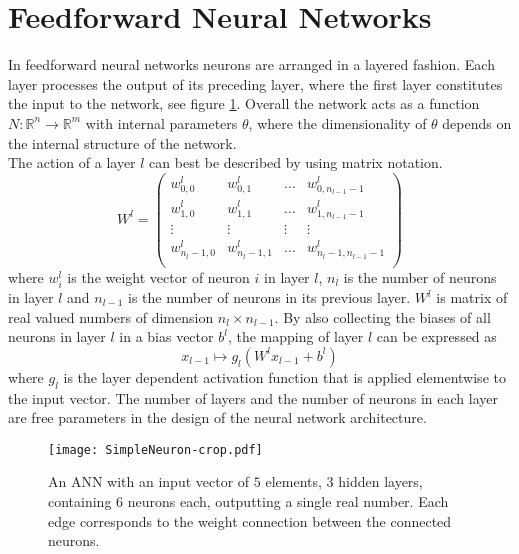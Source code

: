\section{Feedforward Neural Networks}
\label{sec:feedworwardNetworks}
In feedforward neural networks neurons are arranged in a layered fashion. Each layer processes the output of its preceding layer, where the first layer constitutes the input to the network, see figure \ref{fig:ANN}. Overall the network acts as a function $N: \mathbb{R}^n \rightarrow \mathbb{R}^m$ with internal parameters $\theta$, where the dimensionality of $\theta$ depends on the internal structure of the network.\\

The action of a layer $l$ can best be described by using matrix notation. 
\begin{equation}
W^l = 
\begin{pmatrix}
w_{0,0}^l & w_{0,1}^l & \dots & w_{0,n_{l-1}-1}^l \\
w_{1,0}^l & w_{1,1}^l & \dots & w_{1,n_{l-1}-1}^l \\
\vdots & \vdots & \vdots & \vdots \\
w_{n_l-1,0}^l & w_{n_l-1,1}^l & \dots & w_{n_l-1,n_{l-1}-1}^l \\
\end{pmatrix}
\end{equation}
where $w_i^l$ is the weight vector of neuron $i$ in layer $l$, $n_l$ is the number of neurons in layer $l$ and $n_{l-1}$ is the number of neurons in its previous layer. $W^l$ is matrix of real valued numbers of dimension $n_l \times n_{l-1}$. By also collecting the biases of all neurons in layer $l$ in a bias vector $b^l$, the mapping of layer $l$ can be expressed as%
\begin{equation}
x_{l-1} \mapsto g_l(W^l x_{l-1} + b^l)
\end{equation}
where $g_l$ is the layer dependent activation function that is applied elementwise to the input vector. The number of layers and the number of neurons in each layer are free parameters in the design of the neural network architecture. \\
\begin{figure}[H]
\centering
  \texttt{[image: SimpleNeuron-crop.pdf]}
  \caption{An ANN with an input vector of $5$ elements, $3$ hidden layers, containing $6$ neurons each, outputting a single real number. Each edge corresponds to the weight connection between the connected neurons. }
  \label{fig:ANN}
\end{figure}

